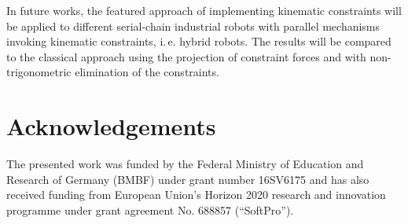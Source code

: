 \documentclass{svproc}
\begin{document}
In future works, the featured approach of implementing kinematic constraints will be applied to different serial-chain industrial robots with parallel mechanisms invoking kinematic constraints, i.\,e. hybrid robots.
The results will be compared to the classical approach using the projection of constraint forces and with non-trigonometric elimination of the constraints.


%


\section*{Acknowledgements}

The presented work was funded by the Federal Ministry of Education and
Research of Germany (BMBF) under grant number 16SV6175 and has also
received funding from European Union's Horizon 2020 research and
innovation programme under grant agreement No. 688857 (``SoftPro'').




\end{document}
